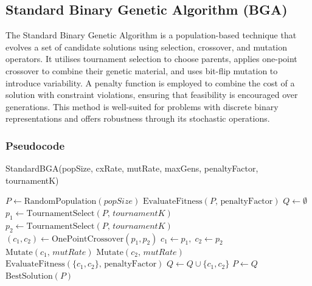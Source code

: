 \documentclass[12pt]{article}
\begin{document}
\subsection{Standard Binary Genetic Algorithm (BGA)}
The Standard Binary Genetic Algorithm is a population-based technique that evolves a set of candidate solutions using selection, crossover, and mutation operators. It utilises tournament selection to choose parents, applies one-point crossover to combine their genetic material, and uses bit-flip mutation to introduce variability. A penalty function is employed to combine the cost of a solution with constraint violations, ensuring that feasibility is encouraged over generations. This method is well-suited for problems with discrete binary representations and offers robustness through its stochastic operations.

\subsubsection{Pseudocode}
\begin{algorithm}[htbp]
\caption{StandardBGA(popSize, cxRate, mutRate, maxGens, penaltyFactor, tournamentK)}
\begin{algorithmic}[1]
  \State \(P \gets \text{RandomPopulation}(popSize)\)
  \State \(\text{EvaluateFitness}(P,\,\text{penaltyFactor})\)
    \State \(Q \gets \emptyset\)
      \State \(p_1 \gets \text{TournamentSelect}(P,\, tournamentK)\)
      \State \(p_2 \gets \text{TournamentSelect}(P,\, tournamentK)\)
        \State \((c_1, c_2) \gets \text{OnePointCrossover}(p_1, p_2)\)
      \Else
        \State \(c_1 \gets p_1,\; c_2 \gets p_2\)
      \EndIf
      \State \(\text{Mutate}(c_1,\, mutRate)\)
      \State \(\text{Mutate}(c_2,\, mutRate)\)
      \State \(\text{EvaluateFitness}(\{c_1, c_2\},\, \text{penaltyFactor})\)
      \State \(Q \gets Q \cup \{c_1, c_2\}\)
    \EndWhile
    \State \(P \gets Q\)
  \EndFor
  \State \Return \(\text{BestSolution}(P)\)
\end{algorithmic}
\end{algorithm}
\end{document}
